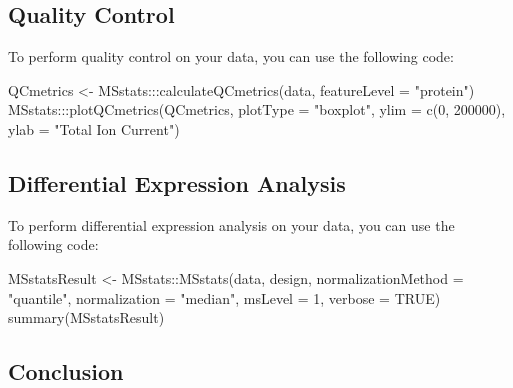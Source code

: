\documentclass[
]{book}
\newenvironment{Shaded}{\begin{snugshade}}{\end{snugshade}}
\newcommand{\AttributeTok}[1]{\textcolor[rgb]{0.77,0.63,0.00}{#1}}
\newcommand{\ConstantTok}[1]{\textcolor[rgb]{0.00,0.00,0.00}{#1}}
\newcommand{\DecValTok}[1]{\textcolor[rgb]{0.00,0.00,0.81}{#1}}
\newcommand{\FunctionTok}[1]{\textcolor[rgb]{0.00,0.00,0.00}{#1}}
\newcommand{\NormalTok}[1]{#1}
\newcommand{\OtherTok}[1]{\textcolor[rgb]{0.56,0.35,0.01}{#1}}
\newcommand{\SpecialCharTok}[1]{\textcolor[rgb]{0.00,0.00,0.00}{#1}}
\newcommand{\StringTok}[1]{\textcolor[rgb]{0.31,0.60,0.02}{#1}}
\begin{document}
\hypertarget{quality-control}{%
\subsection{Quality Control}\label{quality-control}}

To perform quality control on your data, you can use the following code:

\begin{Shaded}
\begin{Highlighting}[]
\NormalTok{QCmetrics }\OtherTok{\textless{}{-}}\NormalTok{ MSstats}\SpecialCharTok{:::}\FunctionTok{calculateQCmetrics}\NormalTok{(data, }\AttributeTok{featureLevel =} \StringTok{"protein"}\NormalTok{)}
\NormalTok{MSstats}\SpecialCharTok{:::}\FunctionTok{plotQCmetrics}\NormalTok{(QCmetrics, }\AttributeTok{plotType =} \StringTok{"boxplot"}\NormalTok{,}
                        \AttributeTok{ylim =} \FunctionTok{c}\NormalTok{(}\DecValTok{0}\NormalTok{, }\DecValTok{200000}\NormalTok{), }\AttributeTok{ylab =} \StringTok{"Total Ion Current"}\NormalTok{)}
\end{Highlighting}
\end{Shaded}

\hypertarget{differential-expression-analysis}{%
\subsection{Differential Expression Analysis}\label{differential-expression-analysis}}

To perform differential expression analysis on your data, you can use the following code:

\begin{Shaded}
\begin{Highlighting}[]
\NormalTok{MSstatsResult }\OtherTok{\textless{}{-}}\NormalTok{ MSstats}\SpecialCharTok{::}\FunctionTok{MSstats}\NormalTok{(data, design,}
                                  \AttributeTok{normalizationMethod =} \StringTok{"quantile"}\NormalTok{,}
                                  \AttributeTok{normalization =} \StringTok{"median"}\NormalTok{,}
                                  \AttributeTok{msLevel =} \DecValTok{1}\NormalTok{, }\AttributeTok{verbose =} \ConstantTok{TRUE}\NormalTok{)}
\FunctionTok{summary}\NormalTok{(MSstatsResult)}
\end{Highlighting}
\end{Shaded}

\hypertarget{conclusion}{%
\subsection{Conclusion}\label{conclusion}}
\end{document}
